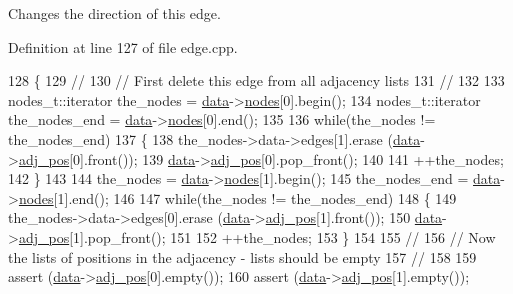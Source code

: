 Changes the direction of this edge. 

Definition at line 127 of file edge.\+cpp.


\begin{DoxyCode}
128 \{
129     \textcolor{comment}{//}
130     \textcolor{comment}{// First delete this edge from all adjacency lists}
131     \textcolor{comment}{//}
132     
133     nodes\_t::iterator the\_nodes = \mbox{\hyperlink{classedge_a0ebb6dfa28b77f47529085049352b436}{data}}->\mbox{\hyperlink{classedge__data_a870bbbb05de6c5f63d434db624c55dd4}{nodes}}[0].begin();
134     nodes\_t::iterator the\_nodes\_end = \mbox{\hyperlink{classedge_a0ebb6dfa28b77f47529085049352b436}{data}}->\mbox{\hyperlink{classedge__data_a870bbbb05de6c5f63d434db624c55dd4}{nodes}}[0].end();
135 
136     \textcolor{keywordflow}{while}(the\_nodes != the\_nodes\_end)
137     \{
138     the\_nodes->data->edges[1].erase (\mbox{\hyperlink{classedge_a0ebb6dfa28b77f47529085049352b436}{data}}->\mbox{\hyperlink{classedge__data_aa325caa449576727df8042bad875bf43}{adj\_pos}}[0].front());
139     \mbox{\hyperlink{classedge_a0ebb6dfa28b77f47529085049352b436}{data}}->\mbox{\hyperlink{classedge__data_aa325caa449576727df8042bad875bf43}{adj\_pos}}[0].pop\_front();
140 
141     ++the\_nodes;
142     \}
143 
144     the\_nodes = \mbox{\hyperlink{classedge_a0ebb6dfa28b77f47529085049352b436}{data}}->\mbox{\hyperlink{classedge__data_a870bbbb05de6c5f63d434db624c55dd4}{nodes}}[1].begin();
145     the\_nodes\_end = \mbox{\hyperlink{classedge_a0ebb6dfa28b77f47529085049352b436}{data}}->\mbox{\hyperlink{classedge__data_a870bbbb05de6c5f63d434db624c55dd4}{nodes}}[1].end();
146 
147     \textcolor{keywordflow}{while}(the\_nodes != the\_nodes\_end)
148     \{
149     the\_nodes->data->edges[0].erase (\mbox{\hyperlink{classedge_a0ebb6dfa28b77f47529085049352b436}{data}}->\mbox{\hyperlink{classedge__data_aa325caa449576727df8042bad875bf43}{adj\_pos}}[1].front());
150     \mbox{\hyperlink{classedge_a0ebb6dfa28b77f47529085049352b436}{data}}->\mbox{\hyperlink{classedge__data_aa325caa449576727df8042bad875bf43}{adj\_pos}}[1].pop\_front();
151 
152     ++the\_nodes;
153     \}
154 
155     \textcolor{comment}{//}
156     \textcolor{comment}{// Now the lists of positions in the adjacency - lists should be empty }
157     \textcolor{comment}{//}
158     
159     assert (\mbox{\hyperlink{classedge_a0ebb6dfa28b77f47529085049352b436}{data}}->\mbox{\hyperlink{classedge__data_aa325caa449576727df8042bad875bf43}{adj\_pos}}[0].empty());
160     assert (\mbox{\hyperlink{classedge_a0ebb6dfa28b77f47529085049352b436}{data}}->\mbox{\hyperlink{classedge__data_aa325caa449576727df8042bad875bf43}{adj\_pos}}[1].empty());

\end{DoxyCode}
